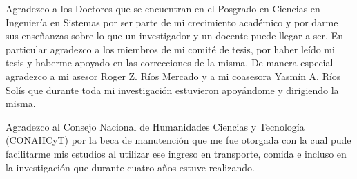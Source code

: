 Agradezco a los Doctores que se encuentran en el Posgrado en Ciencias en Ingeniería en Sistemas por ser parte de mi crecimiento académico y por darme sus enseñanzas sobre lo que un investigador y un docente puede llegar a ser. En particular agradezco a los miembros de mi comité de tesis, por haber leído mi tesis y haberme apoyado en las correcciones de la misma. De manera especial agradezco a mi asesor Roger Z. Ríos Mercado y a mi coasesora Yasmín A. Ríos Solís que durante toda mi investigación estuvieron apoyándome y dirigiendo la misma. 

Agradezco al Consejo Nacional de Humanidades Ciencias y Tecnología (CONAHCyT) por la beca de manutención que me fue otorgada con la cual pude facilitarme mis estudios al utilizar ese ingreso en transporte, comida e incluso en la investigación que durante cuatro años estuve realizando. 
